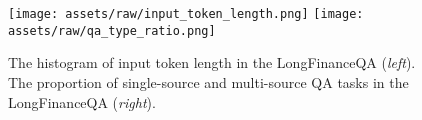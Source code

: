 \begin{figure}
    \centering
    \texttt{[image: assets/raw/input\_token\_length.png]}
    \texttt{[image: assets/raw/qa\_type\_ratio.png]}
    \caption{The histogram of input token length in the LongFinanceQA (\textit{left}). The proportion of single-source and multi-source QA tasks in the LongFinanceQA (\textit{right}).}
    \label{fig:data_stat}
\end{figure}